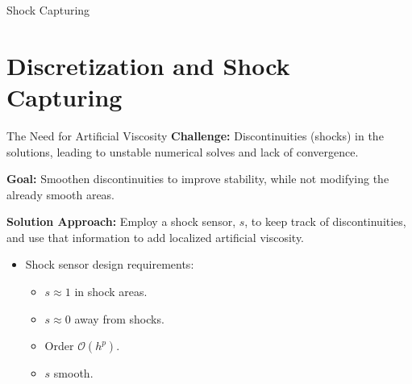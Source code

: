 \documentclass{beamer}
\newcounter{sectionframes}
\newcommand{\setsectionframes}[1]{%
  \setcounter{sectionframes}{#1}%
}
\newcounter{sectionframecount}
\begin{document}
\begin{frame}[plain]
  \vfill
  \centering
  {Shock Capturing}
  \vfill
\end{frame}


\section{Discretization and Shock Capturing}


\setsectionframes{6}


\begin{frame}[t]{The Need for Artificial Viscosity}
\textbf{Challenge:} Discontinuities (shocks) in the solutions, leading to unstable
numerical solves and lack of convergence.

\vspace{20pt}
\textbf{Goal:} Smoothen discontinuities to improve stability, while not modifying
the already smooth areas.

\vspace{20pt}
\textbf{Solution Approach:} Employ a shock sensor, $s$, to keep track of discontinuities, and use that information to add localized artificial viscosity.

\vspace{8pt}
\begin{itemize}
  \item Shock sensor design requirements:
  \begin{itemize}
    \item $s \approx 1$ in shock areas.
    \item $s \approx 0$ away from shocks.
    \item Order $\mathcal{O}(h^p)$.
    \item $s$ smooth.
  \end{itemize}
\end{itemize}

\end{frame}

\end{document}
